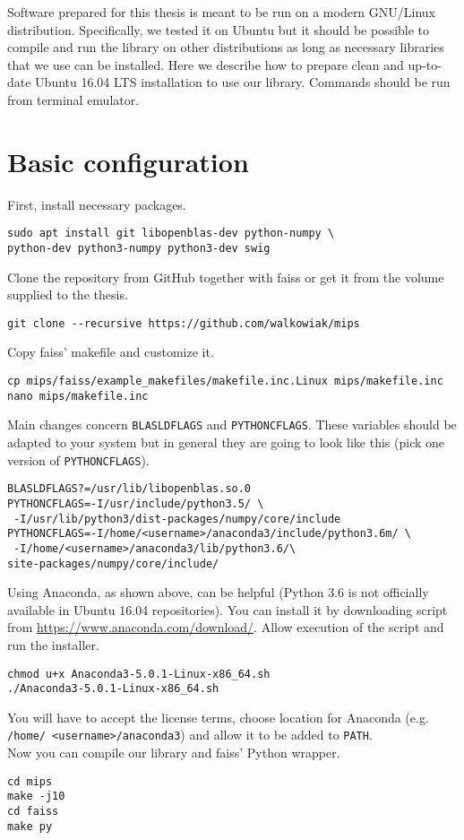 Software prepared for this thesis is meant to be run on a modern GNU/Linux distribution.
Specifically, we tested it on Ubuntu but it should be possible to compile and run the library on other distributions as long as necessary libraries that we use can be installed.
Here we describe how to prepare clean and up-to-date Ubuntu 16.04 LTS installation to use our library.
Commands should be run from terminal emulator.
\section{Basic configuration}
\noindent
First, install necessary packages.
\begin{verbatim}
sudo apt install git libopenblas-dev python-numpy \
python-dev python3-numpy python3-dev swig
\end{verbatim}
Clone the repository from GitHub together with faiss or get it from the volume supplied to the thesis.
\begin{verbatim}
git clone --recursive https://github.com/walkowiak/mips
\end{verbatim}
Copy faiss' makefile and customize it.
\begin{verbatim}
cp mips/faiss/example_makefiles/makefile.inc.Linux mips/makefile.inc
nano mips/makefile.inc
\end{verbatim}
Main changes concern \texttt{BLASLDFLAGS} and \texttt{PYTHONCFLAGS}.
These variables should be adapted to your system but in general they are going to look like this (pick one version of \texttt{PYTHONCFLAGS}).
\begin{verbatim}
BLASLDFLAGS?=/usr/lib/libopenblas.so.0
PYTHONCFLAGS=-I/usr/include/python3.5/ \
 -I/usr/lib/python3/dist-packages/numpy/core/include
PYTHONCFLAGS=-I/home/<username>/anaconda3/include/python3.6m/ \
 -I/home/<username>/anaconda3/lib/python3.6/\
site-packages/numpy/core/include/
\end{verbatim}
Using Anaconda, as shown above, can be helpful (Python 3.6 is not officially available in Ubuntu 16.04 repositories). You can install it by downloading script from \url{https://www.anaconda.com/download/}.
Allow execution of the script and run the installer.
\begin{verbatim}
chmod u+x Anaconda3-5.0.1-Linux-x86_64.sh
./Anaconda3-5.0.1-Linux-x86_64.sh
\end{verbatim}
You will have to accept the license terms, choose location for Anaconda (e.g. \texttt{/home/ <username>/anaconda3}) and allow it to be added to \texttt{PATH}.\\
Now you can compile our library and faiss' Python wrapper.
\begin{verbatim}
cd mips
make -j10
cd faiss
make py
\end{verbatim}
